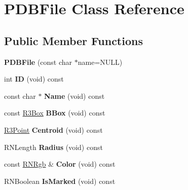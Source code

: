 \hypertarget{class_p_d_b_file}{}\section{P\+D\+B\+File Class Reference}
\label{class_p_d_b_file}
\subsection*{Public Member Functions}
\begin{DoxyCompactItemize}
\item 
{\bfseries P\+D\+B\+File} (const char $\ast$name=N\+U\+LL)\hypertarget{class_p_d_b_file_a614e98ad54b0c9ce8e6c6f47e188541c}{}\label{class_p_d_b_file_a614e98ad54b0c9ce8e6c6f47e188541c}

\item 
int {\bfseries ID} (void) const \hypertarget{class_p_d_b_file_a3c98ca7e4842ca70c765c5f6c7019d9b}{}\label{class_p_d_b_file_a3c98ca7e4842ca70c765c5f6c7019d9b}

\item 
const char $\ast$ {\bfseries Name} (void) const \hypertarget{class_p_d_b_file_a7b6618a41bc391e1dd22f8b0b311c971}{}\label{class_p_d_b_file_a7b6618a41bc391e1dd22f8b0b311c971}

\item 
const \hyperlink{class_r3_box}{R3\+Box} {\bfseries B\+Box} (void) const \hypertarget{class_p_d_b_file_a9da2f091f6b7bbd4e313927545755aae}{}\label{class_p_d_b_file_a9da2f091f6b7bbd4e313927545755aae}

\item 
\hyperlink{class_r3_point}{R3\+Point} {\bfseries Centroid} (void) const \hypertarget{class_p_d_b_file_ae970d8bde37ed109b73fa5497275f8a3}{}\label{class_p_d_b_file_ae970d8bde37ed109b73fa5497275f8a3}

\item 
R\+N\+Length {\bfseries Radius} (void) const \hypertarget{class_p_d_b_file_a094d324d934e2d9ea84ee7271172c57a}{}\label{class_p_d_b_file_a094d324d934e2d9ea84ee7271172c57a}

\item 
const \hyperlink{class_r_n_rgb}{R\+N\+Rgb} \& {\bfseries Color} (void) const \hypertarget{class_p_d_b_file_a6d50955b0d57bb3890626b2a4658c241}{}\label{class_p_d_b_file_a6d50955b0d57bb3890626b2a4658c241}

\item 
R\+N\+Boolean {\bfseries Is\+Marked} (void) const \hypertarget{class_p_d_b_file_a1142d1cfc44466521bb94ce6a7b1f5a9}{}\label{class_p_d_b_file_a1142d1cfc44466521bb94ce6a7b1f5a9}


\end{DoxyCompactItemize}
